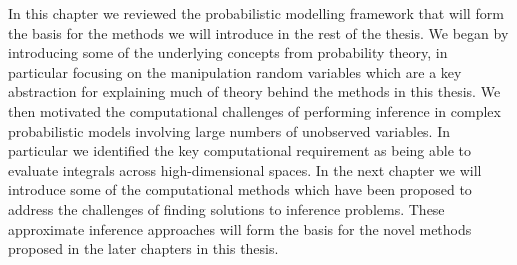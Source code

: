 In this chapter we reviewed the probabilistic modelling framework that will form the basis for the methods we will introduce in the rest of the thesis. We began by introducing some of the underlying concepts from probability theory, in particular focusing on the manipulation random variables which are a key abstraction for explaining much of theory behind the methods in this thesis.  %
We then motivated the computational challenges of performing inference in complex probabilistic models involving large numbers of unobserved variables. In particular we identified the key computational requirement as being able to evaluate integrals across high-dimensional spaces. In the next chapter we will introduce some of the computational methods which have been proposed to address the challenges of finding solutions to inference problems. These approximate inference approaches will form the basis for the novel methods proposed in the later chapters in this thesis.

